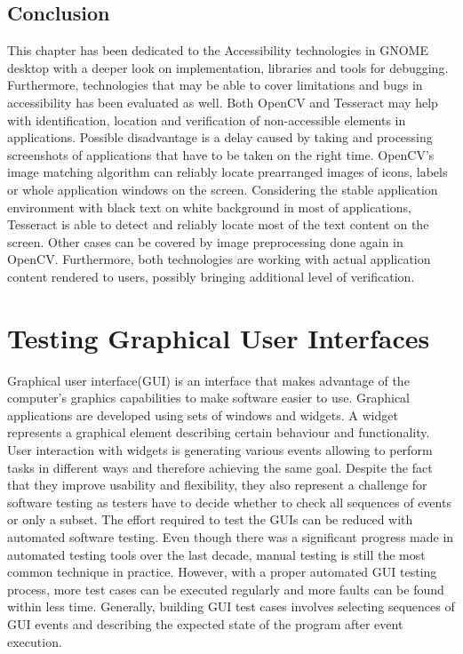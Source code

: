 \section{Conclusion}
This chapter has been dedicated to the Accessibility technologies in GNOME desktop with a deeper look on implementation, libraries and tools for debugging. Furthermore, technologies that may be able to cover limitations and bugs in accessibility has been evaluated as well. Both OpenCV and Tesseract may help with identification, location and verification of non-accessible elements in applications. Possible disadvantage is a delay caused by taking and processing screenshots of applications that have to be taken on the right time. OpenCV's image matching algorithm can reliably locate prearranged images of icons, labels or whole application windows on the screen. Considering the stable application environment with black text on white background in most of applications, Tesseract is able to detect and reliably locate most of the text content on the screen. Other cases can be covered by image preprocessing done again in OpenCV. Furthermore, both technologies are working with actual application content rendered to users, possibly bringing additional level of verification.

\chapter{Testing Graphical User Interfaces}
Graphical user interface(GUI) is an interface that makes advantage of the computer's graphics capabilities to make software easier to use.\cite{guidefinition} Graphical applications are developed using sets of windows and widgets. A widget represents a graphical element describing certain behaviour and functionality. User interaction with widgets is generating various events allowing to perform tasks in different ways and therefore achieving the same goal. Despite the fact that they improve usability and flexibility, they also represent a challenge for software testing as testers have to decide whether to check all sequences of events or only a subset. The effort required to test the GUIs can be reduced with automated software testing. Even though there was a significant progress made in automated testing tools over the last decade, manual testing is still the most common technique in practice. However, with a proper automated GUI testing process, more test cases can be executed regularly and more faults can be found within less time.\cite{patternbasedtesting} Generally, building GUI test cases involves selecting sequences of GUI events and describing the expected state of the program after event execution.\cite{NguyenBao2014Gait}


